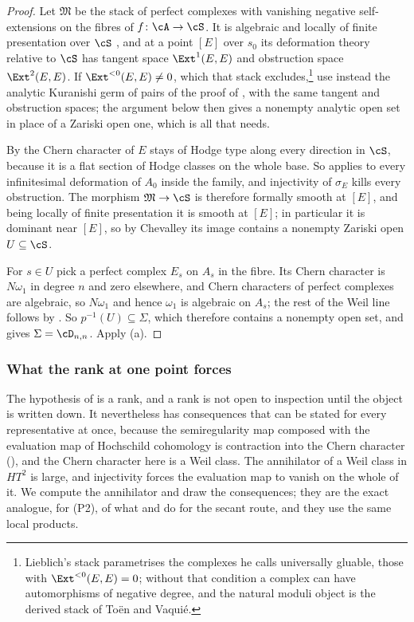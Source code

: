 \begin{proof}
Let $\mathfrak{M}$ be the stack of perfect complexes with vanishing negative
self-extensions on the fibres of $f\colon\cA\to\cS$. It is algebraic and
locally of finite presentation over $\cS$ \cite{Lie06}, and at a point $[E]$
over $s_{0}$ its deformation theory relative to $\cS$ has tangent space
$\Ext^{1}(E,E)$ and obstruction space $\Ext^{2}(E,E)$. If
$\Ext^{<0}(E,E)\ne0$, which that stack excludes,\footnote{Lieblich's
stack parametrises the complexes he calls universally gluable, those with
$\Ext^{<0}(E,E)=0$; without that condition a complex can have automorphisms
of negative degree, and the natural moduli object is the derived stack of
To\"en and Vaqui\'e.} use instead the analytic Kuranishi germ of pairs of the
proof of , with the same tangent and obstruction spaces; the argument below then gives a nonempty
analytic open set in place of a Zariski open one, which is all that
 needs.

By  the Chern character of $E$ stays of Hodge type along
every direction in $\cS$, because it is a flat section of Hodge classes on the
whole base. So  applies to every infinitesimal deformation of
$A_{0}$ inside the family, and injectivity of $\sigma_{E}$ kills every
obstruction. The morphism $\mathfrak{M}\to\cS$ is therefore formally smooth at
$[E]$, and being locally of finite presentation it is smooth at $[E]$; in
particular it is dominant near $[E]$, so by Chevalley its image contains a
nonempty Zariski open $U\subseteq\cS$.

For $s\in U$ pick a perfect complex $E_{s}$ on $A_{s}$ in the fibre. Its
Chern character is $N\omega_{1}$ in degree $n$ and zero elsewhere, and Chern
characters of perfect complexes are algebraic, so $N\omega_{1}$ and hence
$\omega_{1}$ is algebraic on $A_{s}$; the rest of the Weil line follows by
. So $p^{-1}(U)\subseteq\Sigma$, which therefore
contains a nonempty open set, and  gives
$\Sigma=\cD_{n,n}$. Apply (a).
\end{proof}

\subsubsection*{What the rank at one point forces}

The hypothesis of  is a rank, and a rank is not
open to inspection until the object is written down. It nevertheless has
consequences that can be stated for every representative at once, because the
semiregularity map composed with the evaluation map of Hochschild cohomology
is contraction into the Chern character (), and the
Chern character here is a Weil class. The annihilator of a Weil class in
$HT^{2}$ is large, and injectivity forces the evaluation map to vanish on the
whole of it. We compute the annihilator and draw the consequences; they are the
exact analogue, for (P2), of what  and
 do for the secant route, and they use the same local
products.

